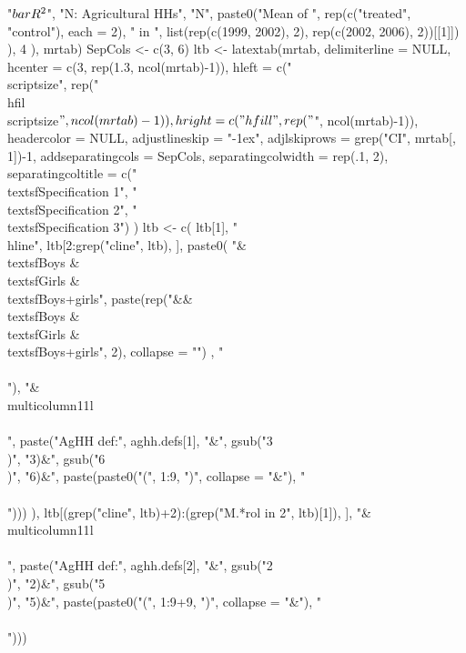 \begin{Schunk}
\begin{Sinput}
{{{              "$\\bar{R}^{2}$", "N: Agricultural HHs", "N",
              paste0("Mean of ", rep(c("treated", "control"), each = 2), " in ", 
                list(rep(c(1999, 2002), 2), rep(c(2002, 2006), 2))[[1]])
               ), 4
            ), 
         mrtab)
      SepCols <- c(3, 6) 
      ltb <- latextab(mrtab, delimiterline = NULL, 
          hcenter = c(3, rep(1.3, ncol(mrtab)-1)),
          hleft = c("\\scriptsize", rep("\\hfil\\scriptsize$", ncol(mrtab)-1)), 
          hright = c("\\hfill", rep("$", ncol(mrtab)-1)),
          headercolor = NULL, 
          adjustlineskip = "-1ex", adjlskiprows = grep("CI", mrtab[, 1])-1,
          addseparatingcols = SepCols, separatingcolwidth = rep(.1, 2), 
          separatingcoltitle = c("\\textsf{Specification 1}", "\\textsf{Specification 2}", "\\textsf{Specification 3}")
        ) 
      ltb <- c(
        ltb[1], "\\hline", 
        ltb[2:grep("cline", ltb), ],
        paste0(
          "&\\textsf{Boys} & \\textsf{Girls} & \\textsf{Boys+girls}",
          paste(rep("&&\\textsf{Boys} & \\textsf{Girls} & \\textsf{Boys+girls}", 2), collapse = "")
          , "\\\\"),
        "&\\multicolumn{11}{l}{}\\\\",
        paste("AgHH def:", aghh.defs[1], "&",
          gsub("3\\)", "3)&", gsub("6\\)", "6)&", paste(paste0("(", 1:9, ")", collapse = "&"), "\\\\")))
          ),
        ltb[(grep("cline", ltb)+2):(grep("M.*rol in 2", ltb)[1]), ], 
        "&\\multicolumn{11}{l}{}\\\\",
        paste("AgHH def:", aghh.defs[2], "&",
          gsub("2\\)", "2)&", gsub("5\\)", "5)&", paste(paste0("(", 1:9+9, ")", collapse = "&"), "\\\\")))
}}}
\end{Sinput}
\end{Schunk}
